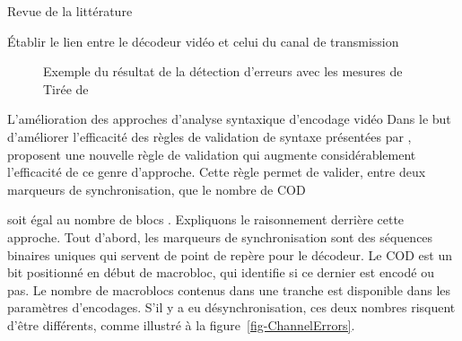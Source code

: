 \documentclass[letterpaper, twoside, 12pt,memoire]{thETS}
\newcommand{\fig}[1]{figure~\ref{#1}}
\begin{document}
\begin{chapter}{Revue de la littérature}
\begin{section}{Établir le lien entre le décodeur vidéo et celui du canal de
transmission}
\begin{figure}
{\begin{varwidth}{\textwidth}
{\label{fig-LenaDamaged}
}
\end{varwidth}}
\caption{Exemple du résultat de la détection d'erreurs avec les mesures de \citeauthor{Ye2003}
\\Tirée de \citet[p.~371]{Ye2003}}
\label{fig-LenaYe}
\end{figure}

\end{section}

\begin{section}{L'amélioration des approches d'analyse syntaxique d'encodage
vidéo}
\label{sect-SyntaxeAnalysis}
Dans le but d'améliorer l'efficacité des règles de validation de syntaxe
présentées par \citet{Talluri1998}, \citeauthor{Yan2003} proposent une nouvelle
règle de validation qui augmente considérablement l'efficacité de ce genre
d'approche. Cette règle permet de valider, entre deux marqueurs de
synchronisation, que le nombre de COD

 soit égal au nombre de blocs
\citep{Yan2003}. Expliquons le raisonnement derrière cette approche. Tout
d'abord, les marqueurs de synchronisation sont des séquences binaires uniques
qui servent de point de repère pour le décodeur. Le COD est un bit positionné en
début de macrobloc, qui identifie si ce dernier est encodé ou pas. Le nombre de
macroblocs contenus dans une tranche est disponible dans les paramètres
d'encodages. S'il y a eu désynchronisation, ces deux nombres risquent d'être différents,
comme illustré à la \fig{fig-ChannelErrors}.


\end{section}
\end{chapter}
\end{document}
